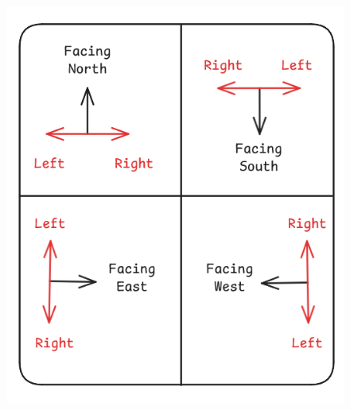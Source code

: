 \begin{figure}[h!]
    \centering
    \includegraphics[width=0.4\linewidth]{LRDI/Images/Arrangements_Directions.png}    
\end{figure}
